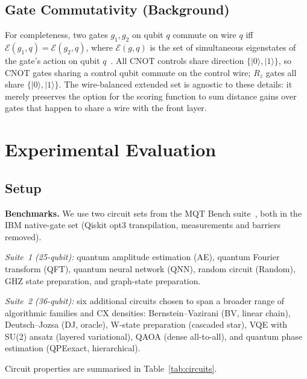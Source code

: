 \documentclass[conference]{IEEEtran}
\newcommand{\eig}[1]{\mathcal{E}(#1)}
\begin{document}
\subsection{Gate Commutativity (Background)}

For completeness, two gates $g_1, g_2$ on qubit $q$ commute on wire $q$ iff
$\eig{g_1,q} = \eig{g_2,q}$, where $\eig{g,q}$ is the set of simultaneous
eigenstates of the gate's action on qubit $q$~\cite{hong2024commutativity}.
All CNOT controls share direction $\{|0\rangle,|1\rangle\}$, so CNOT gates
sharing a control qubit commute on the control wire; $R_z$ gates all share
$\{|0\rangle,|1\rangle\}$.
The wire-balanced extended set is agnostic to these details: it merely
preserves the option for the scoring function to sum distance gains over
gates that happen to share a wire with the front layer.


\section{Experimental Evaluation}
\label{sec:experiments}

\subsection{Setup}

\textbf{Benchmarks.}
We use two circuit sets from the MQT Bench suite~\cite{quetschlich2023mqtbench},
both in the IBM native-gate set (Qiskit opt3 transpilation, measurements and
barriers removed).

\emph{Suite~1 (25-qubit):} quantum amplitude estimation (AE), quantum Fourier
transform (QFT), quantum neural network (QNN), random circuit (Random), GHZ
state preparation, and graph-state preparation.

\emph{Suite~2 (36-qubit):} six additional circuits chosen to span a broader
range of algorithmic families and CX densities: Bernstein--Vazirani (BV, linear
chain), Deutsch--Jozsa (DJ, oracle), W-state preparation (cascaded star),
VQE with SU(2) ansatz (layered variational), QAOA (dense all-to-all), and
quantum phase estimation (QPEexact, hierarchical).

Circuit properties are summarised in Table~\ref{tab:circuits}.
\end{document}
